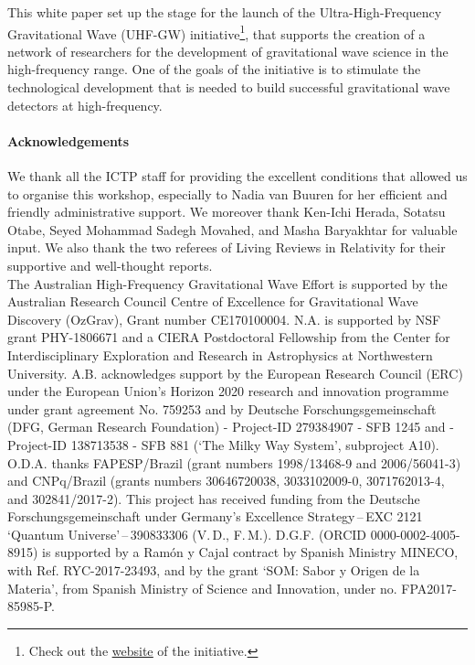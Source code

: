 \documentclass[11pt,a4paper]{article}
\begin{document}
This white paper set up the stage for the launch of the Ultra-High-Frequency Gravitational Wave (UHF-GW) initiative\footnote{Check out the \href{http://www.ctc.cam.ac.uk/activities/UHF-GW.php}{\underline{website}} of the initiative.}, that supports the creation of a network of researchers for the development of gravitational wave science in the high-frequency range. One of the goals of the initiative is to stimulate the technological development that is needed to build successful gravitational wave detectors at high-frequency.


\paragraph{Acknowledgements}
We thank all the ICTP staff for providing the excellent conditions that allowed us to organise this workshop, especially to Nadia van Buuren for her efficient and friendly administrative support.
We moreover thank Ken-Ichi Herada, Sotatsu Otabe, Seyed Mohammad Sadegh Movahed, and Masha Baryakhtar for valuable input. We also thank the two referees of Living Reviews in Relativity for their supportive and well-thought reports.\\
The Australian High-Frequency Gravitational Wave Effort is supported by the Australian Research Council Centre of Excellence for Gravitational Wave Discovery (OzGrav), Grant number CE170100004. 
N.A. is supported by NSF grant PHY-1806671 and a CIERA Postdoctoral Fellowship from the Center for Interdisciplinary Exploration and Research in Astrophysics at Northwestern University.
A.B. acknowledges support by the European Research Council (ERC) under the European Union's Horizon 2020 research and innovation programme under grant agreement No. 759253 and by Deutsche Forschungsgemeinschaft (DFG, German Research Foundation) - Project-ID 279384907 - SFB 1245 and - Project-ID 138713538 - SFB 881 (`The Milky Way System', subproject A10).
O.D.A. thanks FAPESP/Brazil (grant numbers 1998/13468-9 and 2006/56041-3) and CNPq/Brazil (grants numbers 306467{\textunderscore}2003{\textunderscore}8, 303310{\textunderscore}2009-0, 307176{\textunderscore}2013-4, and 302841/2017-2).
This project has received funding from the Deutsche Forschungsgemeinschaft under Germany's Excellence Strategy\,--\,EXC 2121 `Quantum Universe'\,--\,390833306 (V.\,D., F.\,M.).
D.G.F. (ORCID 0000-0002-4005-8915) is supported by a Ram\'on y Cajal contract by Spanish Ministry MINECO, with Ref. RYC-2017-23493, and by the grant `SOM: Sabor y Origen de la Materia', from Spanish Ministry of Science and Innovation, under no. FPA2017-85985-P.
\end{document}
